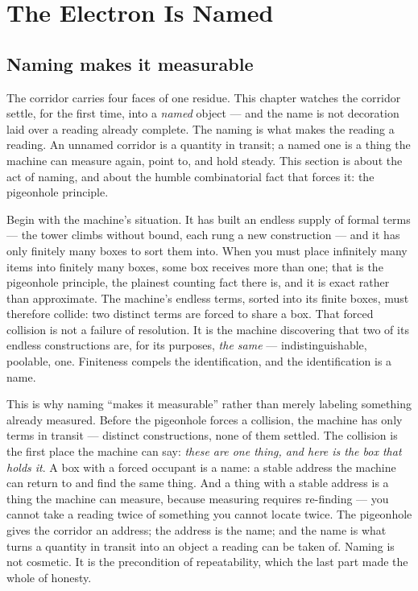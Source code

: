 \chapter{The Electron Is Named}

\section{Naming makes it measurable}

The corridor carries four faces of one residue. This chapter watches the corridor settle, for the first time, into a
\emph{named} object --- and the name is not decoration laid over a reading already complete. The naming is what makes the
reading a reading. An unnamed corridor is a quantity in transit; a named one is a thing the machine can measure again,
point to, and hold steady. This section is about the act of naming, and about the humble combinatorial fact that forces
it: the pigeonhole principle.

Begin with the machine's situation. It has built an endless supply of formal terms --- the tower climbs without bound,
each rung a new construction --- and it has only finitely many boxes to sort them into. When you must place infinitely
many items into finitely many boxes, some box receives more than one; that is the pigeonhole principle, the plainest
counting fact there is, and it is exact rather than approximate. The machine's endless terms, sorted into its finite
boxes, must therefore collide: two distinct terms are forced to share a box. That forced collision is not a failure of
resolution. It is the machine discovering that two of its endless constructions are, for its purposes,
\emph{the same} --- indistinguishable, poolable, one. Finiteness compels the identification, and the identification is a
name.

This is why naming ``makes it measurable'' rather than merely labeling something already measured. Before the pigeonhole
forces a collision, the machine has only terms in transit --- distinct constructions, none of them settled. The
collision is the first place the machine can say: \emph{these are one thing, and here is the box that holds it}. A box
with a forced occupant is a name: a stable address the machine can return to and find the same thing. And a thing with a
stable address is a thing the machine can measure, because measuring requires re-finding --- you cannot take a reading
twice of something you cannot locate twice. The pigeonhole gives the corridor an address; the address is the name; and
the name is what turns a quantity in transit into an object a reading can be taken of. Naming is not cosmetic. It is the
precondition of repeatability, which the last part made the whole of honesty.

